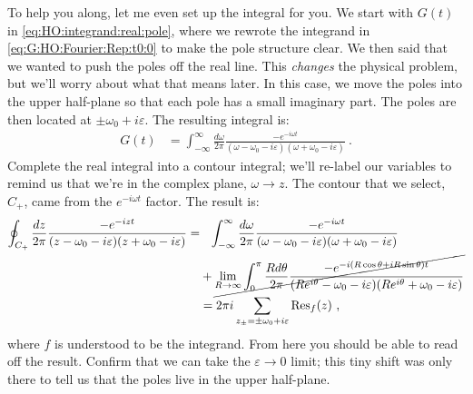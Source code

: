To help you along, let me even set up the integral for you. We start with $G(t)$ in \eqref{eq:HO:integrand:real:pole}, where we rewrote the integrand in \eqref{eq:G:HO:Fourier:Rep:t0:0} to make the pole structure clear. We then said that we wanted to push the poles off the real line. This \emph{changes} the physical problem, but we'll worry about what that means later. In this case, we move the poles into the upper half-plane so that each pole has a small imaginary part. The poles are then located at $\pm \omega_0 + i \varepsilon$. The resulting integral is:
\begin{align}
  G(t) &= 
  \int_{-\infty}^\infty \frac{d\omega}{2\pi} 
  \frac{-e^{-i\omega t}}{(\omega - \omega_0-i\varepsilon)(\omega + \omega_0-i\varepsilon)} 
  \ .
\end{align}
Complete the real integral into a contour integral; we'll re-label our variables to remind us that we're in the complex plane, $\omega\to z$. The contour that we select, $C_+$, came from the $e^{-i\omega t}$ factor. The result is:
\begin{align}
  \oint_{C_+}
  \frac{dz}{2\pi} 
  \frac{-e^{-iz t}}{(z - \omega_0-i\varepsilon)(z + \omega_0-i\varepsilon)}
  =&\phantom{+} 
  \int_{-\infty}^\infty \frac{d\omega}{2\pi} 
  \frac{-e^{-i\omega t}}{(\omega - \omega_0-i\varepsilon)(\omega + \omega_0-i\varepsilon)} 
  \nonumber
  \\
  &
  + 
  \cancel{
  \lim_{R\to\infty} \int_{0}^\pi \frac{Rd\theta}{2\pi} 
  \frac{-e^{-i(R\cos\theta + i R\sin\theta)t}}{(Re^{i\theta} - \omega_0-i\varepsilon)(Re^{i\theta} + \omega_0-i\varepsilon)} 
  }
  \label{eq:HO:G:integral:adv:1}
  \\
  &=
  2\pi i \sum_{z_\pm=\pm\omega_0+i\varepsilon} \text{Res}_f(z) \ ,
  \label{eq:HO:G:integral:adv:2}
\end{align}
where $f$ is understood to be the integrand. 
%
From here you should be able to read off the result. Confirm that we can take the $\varepsilon\to 0$ limit; this tiny shift was only there to tell us that the poles live in the upper half-plane.

